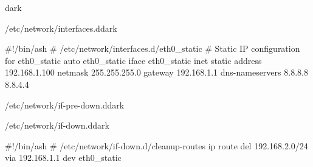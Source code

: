 \begin{baseBoxThree}{}{dark}
    \smallskip
    \begin{baseBoxThree}{/etc/network/interfaces.d}{dark}
        \begin{posnex}
#!/bin/ash
# /etc/network/interfaces.d/eth0_static
# Static IP configuration for eth0_static
auto eth0_static
iface eth0_static inet static
    address 192.168.1.100
    netmask 255.255.255.0
    gateway 192.168.1.1
    dns-nameservers 8.8.8.8 8.8.4.4
        \end{posnex}
    \end{baseBoxThree}
    \smallskip
    \begin{baseBoxThree}{/etc/network/if-pre-down.d}{dark}
    \end{baseBoxThree}
    \smallskip
    \begin{baseBoxThree}{/etc/network/if-down.d}{dark}
        \begin{posnex}
#!/bin/ash
# /etc/network/if-down.d/cleanup-routes
ip route del 192.168.2.0/24 via 192.168.1.1 dev eth0_static
        \end{posnex}
    \end{baseBoxThree}
    \smallskip
\end{baseBoxThree}

